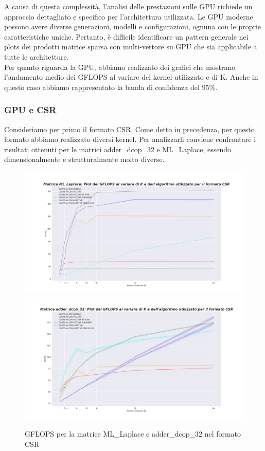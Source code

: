 \documentclass{article}
\begin{document}
A causa di questa complessità, l'analisi delle prestazioni sulle GPU richiede un approccio dettagliato e specifico per l'architettura utilizzata. Le GPU moderne possono avere diverse generazioni, modelli e configurazioni, ognuna con le proprie caratteristiche uniche. Pertanto, è difficile identificare un pattern generale nei plots dei prodotti matrice sparsa con multi-vettore su GPU che sia applicabile a tutte le architetture.\\

Per quanto riguarda la GPU, abbiamo realizzato dei grafici che mostrano l'andamento medio dei GFLOPS al variare del kernel utilizzato e di K. Anche in questo caso abbiamo rappresentato la banda di confidenza del 95\%.
\\
\subsubsection{GPU e CSR}
Consideriamo per primo il formato CSR. Come detto in precedenza, per questo formato abbiamo realizzato diversi kernel. Per analizzarli conviene confrontare i risultati ottenuti per le matrici adder\_dcop\_32 e ML\_Laplace, essendo dimensionalmente e strutturalmente molto diverse.

\begin{figure}[H]
\centering
\includegraphics[width=\textwidth]{Immagini/CSR_GPU_ML_Laplace.png}
\includegraphics[width=\textwidth]{Immagini/CSR_GPU_adder_dcop_32.png}
\caption{GFLOPS per la matrice ML\_Laplace e adder\_dcop\_32 nel formato CSR}
\end{figure}
\end{document}

